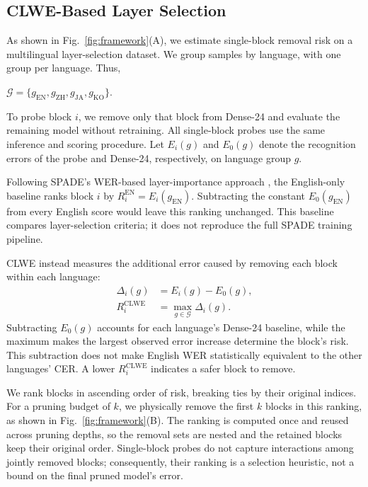 \documentclass{article}
\begin{document}
\subsection{CLWE-Based Layer Selection}
\label{sec:clwe_selection}

As shown in Fig.~\ref{fig:framework}(A), we estimate single-block
removal risk on a multilingual layer-selection dataset. We group
samples by language, with one group per language. Thus,

$\mathcal{G}=\{g_{\mathrm{EN}},g_{\mathrm{ZH}},
g_{\mathrm{JA}},g_{\mathrm{KO}}\}$.

To probe block $i$, we remove only that block from Dense-24 and
evaluate the remaining model without retraining. All single-block
probes use the same inference and scoring procedure. Let $E_i(g)$
and $E_0(g)$ denote the recognition errors of the probe and
Dense-24, respectively, on language group $g$.

Following SPADE's WER-based layer-importance approach
\cite{nguyen2026spade}, the English-only baseline ranks block $i$ by
$R_i^{\mathrm{EN}}=E_i(g_{\mathrm{EN}})$. Subtracting the constant
$E_0(g_{\mathrm{EN}})$ from every English score would leave this
ranking unchanged. This baseline compares layer-selection criteria;
it does not reproduce the full SPADE training pipeline.

CLWE instead measures the additional error caused by removing each
block within each language:
\begingroup
\setlength{\abovedisplayskip}{3pt}
\setlength{\abovedisplayshortskip}{3pt}
\setlength{\belowdisplayskip}{3pt}
\setlength{\belowdisplayshortskip}{3pt}
\begin{equation}
\begin{aligned}
\Delta_i(g) &= E_i(g)-E_0(g),\\
R_i^{\mathrm{CLWE}}
&= \max_{g\in\mathcal{G}}\Delta_i(g).
\end{aligned}
\label{eq:clwe_risk}
\end{equation}
\endgroup
Subtracting $E_0(g)$ accounts for each language's Dense-24 baseline,
while the maximum makes the largest observed error increase determine
the block's risk. This subtraction does not make English WER
statistically equivalent to the other languages' CER. A lower
$R_i^{\mathrm{CLWE}}$ indicates a safer block to remove.

We rank blocks in ascending order of risk, breaking ties by their
original indices. For a pruning budget of $k$, we physically remove
the first $k$ blocks in this ranking, as shown in
Fig.~\ref{fig:framework}(B). The ranking is computed once and reused
across pruning depths, so the removal sets are nested and the
retained blocks keep their original order. Single-block probes do not
capture interactions among jointly removed blocks; consequently,
their ranking is a selection heuristic, not a bound on the final
pruned model's error.
\end{document}
